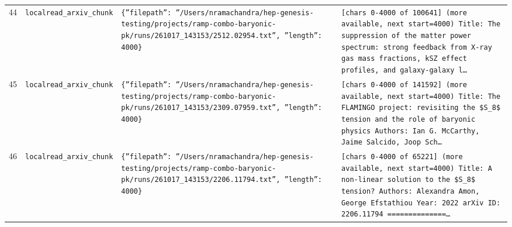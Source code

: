 \documentclass[11pt,a4paper]{article}
\begin{document}
\begin{longtable}{@{}p{}p{}p{}p{}@{}}
44 & \texttt{local}\newline\texttt{read\_\allowbreak{}arxiv\_\allowbreak{}chunk} & \texttt{\{''filepath'':\allowbreak{} ''/\allowbreak{}Users/\allowbreak{}nramachandra/\allowbreak{}hep-genesis-testing/\allowbreak{}projects/\allowbreak{}ramp-combo-baryonic-pk/\allowbreak{}runs/\allowbreak{}261017\_\allowbreak{}143153/\allowbreak{}2512.02954.txt'',\allowbreak{} ''length'':\allowbreak{} 4000\}\allowbreak{}} & \texttt{[chars 0-4000 of 100641]\allowbreak{} (more available,\allowbreak{} next start=\allowbreak{}4000)\allowbreak{}  Title:\allowbreak{} The suppression of the matter power spectrum:\allowbreak{} strong feedback from X-ray gas mass fractions,\allowbreak{} kSZ effect profiles,\allowbreak{} and galaxy-galaxy l\ldots{}\allowbreak{}} \\
45 & \texttt{local}\newline\texttt{read\_\allowbreak{}arxiv\_\allowbreak{}chunk} & \texttt{\{''filepath'':\allowbreak{} ''/\allowbreak{}Users/\allowbreak{}nramachandra/\allowbreak{}hep-genesis-testing/\allowbreak{}projects/\allowbreak{}ramp-combo-baryonic-pk/\allowbreak{}runs/\allowbreak{}261017\_\allowbreak{}143153/\allowbreak{}2309.07959.txt'',\allowbreak{} ''length'':\allowbreak{} 4000\}\allowbreak{}} & \texttt{[chars 0-4000 of 141592]\allowbreak{} (more available,\allowbreak{} next start=\allowbreak{}4000)\allowbreak{}  Title:\allowbreak{} The FLAMINGO project:\allowbreak{} revisiting the \$S\_\allowbreak{}8\$ tension and the role of baryonic physics Authors:\allowbreak{} Ian G. McCarthy,\allowbreak{} Jaime Salcido,\allowbreak{} Joop Sch\ldots{}\allowbreak{}} \\
46 & \texttt{local}\newline\texttt{read\_\allowbreak{}arxiv\_\allowbreak{}chunk} & \texttt{\{''filepath'':\allowbreak{} ''/\allowbreak{}Users/\allowbreak{}nramachandra/\allowbreak{}hep-genesis-testing/\allowbreak{}projects/\allowbreak{}ramp-combo-baryonic-pk/\allowbreak{}runs/\allowbreak{}261017\_\allowbreak{}143153/\allowbreak{}2206.11794.txt'',\allowbreak{} ''length'':\allowbreak{} 4000\}\allowbreak{}} & \texttt{[chars 0-4000 of 65221]\allowbreak{} (more available,\allowbreak{} next start=\allowbreak{}4000)\allowbreak{}  Title:\allowbreak{} A non-linear solution to the \$S\_\allowbreak{}8\$ tension? Authors:\allowbreak{} Alexandra Amon,\allowbreak{} George Efstathiou Year:\allowbreak{} 2022 arXiv ID:\allowbreak{} 2206.11794  =\allowbreak{}=\allowbreak{}=\allowbreak{}=\allowbreak{}=\allowbreak{}=\allowbreak{}=\allowbreak{}=\allowbreak{}=\allowbreak{}=\allowbreak{}=\allowbreak{}=\allowbreak{}=\allowbreak{}=\allowbreak{}\ldots{}\allowbreak{}} \\

\end{longtable}
\end{document}
